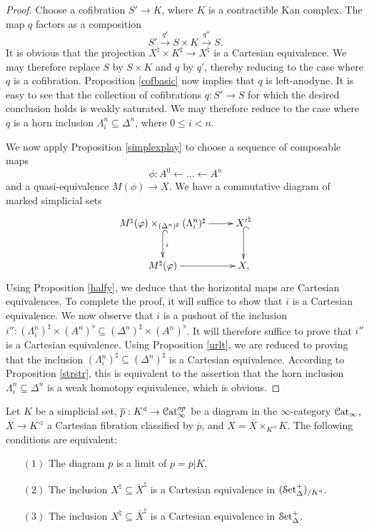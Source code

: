 \begin{proof}
Choose a cofibration $S' \rightarrow K$, where $K$ is a contractible Kan complex.
The map $q$ factors as a composition
$$ S' \stackrel{q'}{\rightarrow} S \times K \stackrel{q''}{\rightarrow} S.$$
It is obvious that the projection $X^{\natural} \times K^{\sharp} \rightarrow X^{\natural}$ is a Cartesian equivalence. We may therefore replace $S$ by $S \times K$ and $q$ by $q'$, thereby reducing to the case where $q$ is a cofibration. Proposition \ref{cofbasic} now implies that
$q$ is left-anodyne. It is easy to see that the collection of cofibrations $q: S' \rightarrow S$ for which the desired conclusion holds is weakly saturated. We may therefore reduce to the case where
$q$ is a horn inclusion $\Lambda^n_i \subseteq \Delta^n$, where $0 \leq i < n$.

We now apply Proposition \ref{simplexplay} to choose a sequence of composable maps
$$ \phi: A^0 \leftarrow \ldots \leftarrow A^n $$ and
a quasi-equivalence $M(\phi) \rightarrow X$. We have a commutative diagram of marked simplicial sets
$$ \xymatrix{ M^{\natural}(\phi) \times_{ (\Delta^n)^{\sharp} } (\Lambda^n_i)^{\sharp}
\ar@{^{(}->}[d]^{i} \ar[r] & {X'}^{\natural} \ar@{^{(}->}[d] \\
M^{\natural}(\phi) \ar[r] & X, }$$
Using Proposition \ref{halfy}, we deduce that the horizontal maps are Cartesian equivalences. To complete the proof, it will suffice to show that $i$ is a Cartesian equivalence. We now observe that $i$ is a pushout of the inclusion $i'': (\Lambda^n_i)^{\sharp} \times (A^n)^{\flat}
\subseteq (\Delta^n)^{\sharp} \times (A^n)^{\flat}$. It will therefore suffice to prove that $i''$
is a Cartesian equivalence. Using Proposition \ref{urlt}, we are reduced to proving that the inclusion
$(\Lambda^n_i)^{\sharp} \subseteq (\Delta^n)^{\sharp}$ is a Cartesian equivalence. According to Proposition \ref{strstr}, this is equivalent to the assertion that the horn inclusion
$\Lambda^n_i \subseteq \Delta^n$ is a weak homotopy equivalence, which is obvious.
\end{proof}

\begin{proposition}\label{charcatcolimit}
Let $K$ be a simplicial set, $\overline{p}: K^{\triangleleft} \rightarrow \operatorname{\mathcal{C}at}_{\infty}^{op}$ be a diagram in the $\infty$-category $\operatorname{\mathcal{C}at}_{\infty}$, 
$\overline{X} \rightarrow K^{\triangleleft}$ a Cartesian fibration classified
by $\overline{p}$, and $X = \overline{X} \times_{ K^{\triangleleft} } K$.
The following conditions are equivalent:
\begin{itemize}
\item[$(1)$] The diagram $\overline{p}$ is a limit of $p = \overline{p} | K$.
\item[$(2)$] The inclusion $X^{\natural} \subseteq \overline{X}^{\natural}$ is a Cartesian equivalence in $(\operatorname{\mathcal{S}et_{\Delta}^{+}})_{/K^{\triangleleft}}$.
\item[$(3)$] The inclusion $X^{\natural} \subseteq \overline{X}^{\natural}$
is a Cartesian equivalence in $\operatorname{\mathcal{S}et_{\Delta}^{+}}$.
\end{itemize}
\end{proposition}

